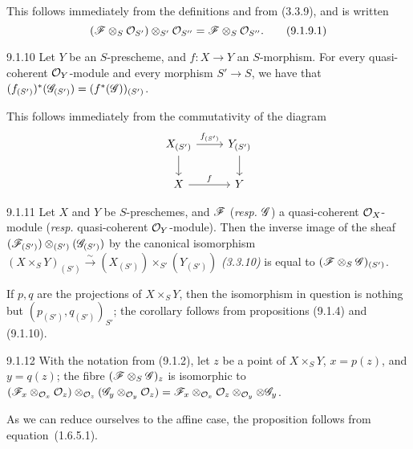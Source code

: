 \documentclass[../main.tex]{subfiles}
\begin{document}
This follows immediately from the definitions and from (3.3.9), and is written
\begin{equation*}
    (\mathscr{F}\otimes_S\mathcal{O}_{S'})\otimes_{S'}\mathcal{O}_{S''} = \mathscr{F}\otimes_S\mathcal{O}_{S''}.\tag{9.1.9.1}
\end{equation*}

\begin{cx}[Proposition]{9.1.10}
    Let $Y$ be an $S$-prescheme, and $f\colon X\to Y$ an $S$-morphism.
    For every quasi-coherent $\mathcal{O}_Y$-module and every morphism $S'\to S$, we have that $(f_{(S')})^*(\mathscr{G}_{(S')})=(f^*(\mathscr{G}))_{(S')}$.
\end{cx}

This follows immediately from the commutativity of the diagram
\begin{equation*}
    \begin{tikzcd}
        X_{(S')}
            \ar{r}{f_{(S')}}
            \ar{d}
        & Y_{(S')}
            \ar{d}\\
        X
            \ar{r}{f}
        & Y
    \end{tikzcd}
\end{equation*}

\begin{cx}[Corollary]{9.1.11}
    Let $X$ and $Y$ be $S$-preschemes, and $\mathscr{F}$ (\emph{resp.} $\mathscr{G}$) a quasi-coherent $\mathcal{O}_X$-module (\emph{resp.} quasi-coherent $\mathcal{O}_Y$-module).
    Then the inverse image of the sheaf $(\mathscr{F}_{(S')})\otimes_{(S')}(\mathscr{G}_{(S')})$ by the canonical isomorphism $(X\times_S Y)_{(S')}\xrightarrow{\sim}(X_{(S')})\times_{S'}(Y_{(S')})$ \emph{(3.3.10)} is equal to $(\mathscr{F}\otimes_S\mathscr{G})_{(S')}$.
\end{cx}

If $p,q$ are the projections of $X\times_S Y$, then the isomorphism in question is nothing but $(p_{(S')}, q_{(S')})_{S'}$; the corollary follows from propositions (9.1.4) and (9.1.10).

\begin{cx}[Proposition]{9.1.12}
    With the notation from (9.1.2), let $z$ be a point of $X\times_S Y$, $x=p(z)$, and $y=q(z)$; the fibre $(\mathscr{F}\otimes_S\mathscr{G})_z$ is isomorphic to $(\mathscr{F}_x\otimes_{\mathcal{O}_x}\mathcal{O}_z)\otimes_{\mathcal{O}_z}(\mathscr{G}_y\otimes_{\mathcal{O}_y}\mathcal{O}_z) = \mathscr{F}_x\otimes_{\mathcal{O}_x}\mathcal{O}_z\otimes_{\mathcal{O}_y}\otimes\mathscr{G}_y$.
\end{cx}

As we can reduce ourselves to the affine case, the proposition follows from equation~(1.6.5.1).
\end{document}
